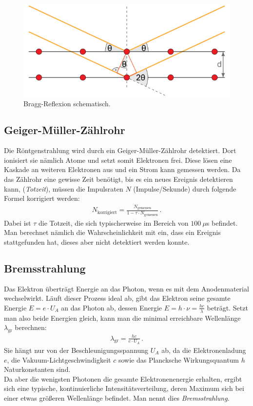 \documentclass[12pt,a4paper,titlepage,headinclude,bibtotoc]{scrartcl}
\begin{document}
\begin{figure}[!h]
	\centering
	\includegraphics[scale=0.7]{Bragg.png}
	\caption{Bragg-Reflexion schematisch. \cite[Datum: 02.01.15]{LP23}}
	\label{fig:Bragg}
\end{figure}

\subsection{Geiger-Müller-Zählrohr}
Die Röntgenstrahlung wird durch ein Geiger-Müller-Zählrohr detektiert.
Dort ionisiert sie nämlich Atome und setzt somit Elektronen frei.
Diese lösen eine Kaskade an weiteren Elektronen aus und ein Strom kann gemessen werden.
Da das Zählrohr eine gewisse Zeit benötigt, bis es ein neues Ereignis detektieren kann, (\emph{Totzeit}), müssen die Impulsraten $N$ (Impulse/Sekunde) durch folgende Formel korrigiert werden:
\begin{align}
	N_\text{korrigiert}=\frac{N_\text{gemessen}}{1-\tau\cdot N_\text{gemessen}}\,.
	\label{eq:totzeit}
\end{align}
Dabei ist $\tau$ die Totzeit, die sich typischerweise im Bereich von $100 ~ \mu$s befindet.
Man berechnet nämlich die Wahrscheinlichkeit mit ein, dass ein Ereignis stattgefunden hat, dieses aber nicht detektiert werden konnte.

\subsection{Bremsstrahlung}
Das Elektron überträgt Energie an das Photon, wenn es mit dem Anodenmaterial wechselwirkt.
Läuft dieser Prozess ideal ab, gibt das Elektron seine gesamte Energie $E=e\cdot U_A$ an das Photon ab, dessen Energie $E=h\cdot \nu=\frac{hc}{\lambda}$ beträgt.
Setzt man also beide Energien gleich, kann man die minimal erreichbare Wellenlänge $\lambda_\text{gr}$ berechnen:
\begin{align}
	\lambda_\text{gr}=\frac{hc}{e \cdot U_A}\,.
	\label{eq:grenzLambda}
\end{align}
Sie hängt nur von der Beschleunigungsspannung $U_A$ ab, da die Elektronenladung $e$, die Vakuum-Lichtgeschwindigkeit $c$ sowie das Plancksche Wirkungsquantum $h$ Naturkonstanten sind.\\
Da aber die wenigsten Photonen die gesamte Elektronenenergie erhalten, ergibt sich eine typische, kontinuierliche Intensitätsverteilung, deren Maximum sich bei einer etwas größeren Wellenlänge befindet.
Man nennt dies \emph{Bremsstrahlung}.
\end{document}
